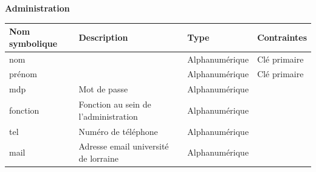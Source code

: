 \documentclass{scrreprt}
\begin{document}
\begin{flushleft}
\textbf{Administration}
\end{flushleft}

\begin{tabular}{|l|l|l|l|}
\hline
\textbf{Nom symbolique} & \textbf{Description} & \textbf{Type} & \textbf{Contraintes} \\
\hline
nom & & Alphanumérique & Clé primaire \\
prénom & & Alphanumérique & Clé primaire \\
mdp & Mot de passe & Alphanumérique & \\
fonction & Fonction au sein de l'administration & Alphanumérique & \\
tel & Numéro de téléphone & Alphanumérique & \\
mail & Adresse email université de lorraine & Alphanumérique & \\
\hline
\end{tabular}
\end{document}
